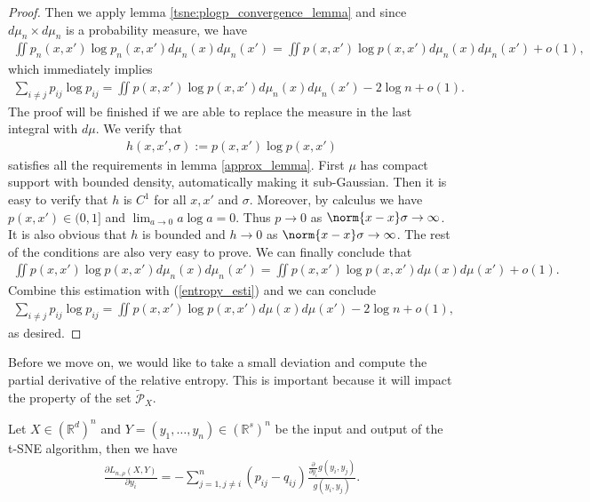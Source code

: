 \begin{proof}
    Then we apply lemma \ref{tsne:plogp_convergence_lemma} and since $d \mu_n
        \times d \mu_n$ is a probability measure, we have
    \begin{align}
        \iint p_n(x,x')\log p_n(x,x') d\mu_n(x)d\mu_n(x') = \iint p(x,x')\log p(x,x') d\mu_n(x)d\mu_n(x') +o(1),
    \end{align}
    which immediately implies
    \begin{align} \label{entropy_esti}
        \sum_{i \neq j}p_{ij} \log p_{ij} = \iint p(x,x')\log p(x,x') d\mu_n(x)d\mu_n(x') -2 \log n + o(1).
    \end{align}
    The proof will be finished if we are able to replace the measure in the last integral with $d \mu$. We verify that
    \begin{align}
        h(x,x',\sigma) :=  p(x,x')\log p(x,x')
    \end{align}
    satisfies all the requirements in lemma \ref{approx_lemma}. First $\mu$ has compact support with bounded density, automatically making it sub-Gaussian. Then it is easy to verify that $h$ is $C^1$ for all $x,x'$ and $\sigma$. Moreover, by calculus we have $p(x,x') \in (0,1]$ and $\lim_{a \to 0} a \log a = 0$. Thus $p \to 0$ as $\norm{x-x}\sigma \to \infty$. It is also obvious that $h$ is bounded and $h \to 0$ as $\norm{x-x}\sigma \to \infty$. The rest of the conditions are also very easy to prove. We can finally conclude that
    \begin{align}
        \iint p(x,x')\log p(x,x') d\mu_n(x)d\mu_n(x') = \iint p(x,x')\log p(x,x') d\mu(x)d\mu(x') + o(1).
    \end{align}
    Combine this estimation with (\ref{entropy_esti}) and we can conclude
    \begin{align}
        \sum_{i \neq j}p_{ij} \log p_{ij} = \iint p(x,x')\log p(x,x') d\mu(x)d\mu(x') - 2\log n + o(1),
    \end{align}
    as desired.
\end{proof}
Before we move on, we would like to take a small deviation and compute the
partial derivative of the relative entropy. This is important because it will
impact the property of the set $\tilde{\mathcal{P}}_X$.
\begin{lemma} \label{derivative_lemma}
    Let $X \in (\mathbb{R}^d)^n$ and $Y = (y_1,\dots,y_n)\in (\mathbb{R}^s)^n$ be the input and output of the t-SNE algorithm, then we have
    \begin{align}
        \frac{\partial L_{n, \rho}(X,Y)}{\partial y_i} = -\sum_{j=1, j \neq i}^n (p_{ij}-q_{ij}) \frac{\frac{\partial}{\partial y_i}g(y_i,y_j)}{g(y_i,y_j)}.
    \end{align}
\end{lemma}
